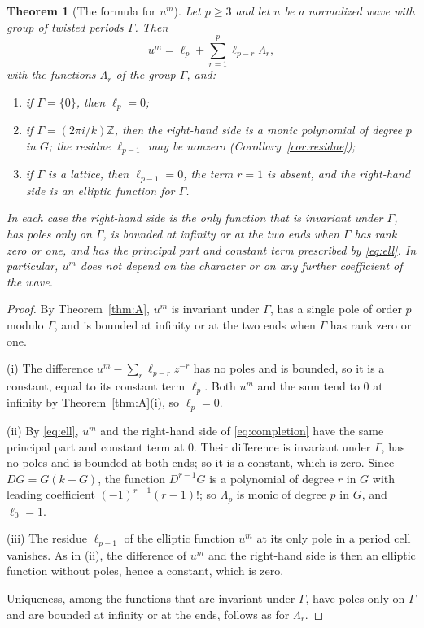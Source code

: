 \documentclass[11pt]{article}
\newtheorem{theorem}{Theorem}[section]
\theoremstyle{definition}
\theoremstyle{remark}
\numberwithin{equation}{section}
\newcommand{\ZZ}{\mathbb Z}
\begin{document}
\begin{theorem}[The formula for \(u^m\)]\label{thm:power}
Let \(p\ge3\) and let \(u\) be a normalized wave with group of twisted
periods \(\Gamma\). Then
\begin{equation}\label{eq:completion}
 u^m=\ell_p+\sum_{r=1}^{p}\ell_{p-r}\Lambda_r,
\end{equation}
with the functions \(\Lambda_r\) of the group \(\Gamma\), and:
\begin{enumerate}[label=\textup{(\roman*)},leftmargin=2.2em]
\item if \(\Gamma=\{0\}\), then \(\ell_p=0\);
\item if \(\Gamma=(2\pi i/k)\ZZ\), then the right-hand side is a monic
polynomial of degree \(p\) in \(G\); the residue \(\ell_{p-1}\) may be
nonzero (Corollary~\ref{cor:residue});
\item if \(\Gamma\) is a lattice, then \(\ell_{p-1}=0\), the term
\(r=1\) is absent, and the right-hand side is an elliptic function for
\(\Gamma\).
\end{enumerate}
In each case the right-hand side is the only function that is invariant
under \(\Gamma\), has poles only on \(\Gamma\), is bounded at infinity or
at the two ends when \(\Gamma\) has rank zero or one, and has the
principal part and constant term prescribed by \eqref{eq:ell}. In particular, \(u^m\) does not depend on the character
or on any further coefficient of the wave.
\end{theorem}

\begin{proof}
By Theorem~\ref{thm:A}, \(u^m\) is invariant under \(\Gamma\), has a
single pole of order \(p\) modulo \(\Gamma\), and is bounded at infinity
or at the two ends when \(\Gamma\) has rank zero or one.

(i) The difference \(u^m-\sum_r\ell_{p-r}z^{-r}\) has no poles and is
bounded, so it is a constant, equal to its constant term \(\ell_p\).
Both \(u^m\) and the sum tend to \(0\) at infinity by
Theorem~\ref{thm:A}(i), so \(\ell_p=0\).

(ii) By \eqref{eq:ell}, \(u^m\) and the right-hand side of
\eqref{eq:completion} have the same principal part and constant term
at \(0\). Their difference is invariant under \(\Gamma\), has no poles
and is bounded at both ends; so it is a constant, which is zero. Since
\(DG=G(k-G)\), the function \(D^{r-1}G\) is a polynomial of degree \(r\)
in \(G\) with leading coefficient \((-1)^{r-1}(r-1)!\); so \(\Lambda_p\)
is monic of degree \(p\) in \(G\), and \(\ell_0=1\).

(iii) The residue \(\ell_{p-1}\) of the elliptic function \(u^m\) at its
only pole in a period cell vanishes. As in (ii), the difference of
\(u^m\) and the right-hand side is then an elliptic function without
poles, hence a constant, which is zero.

Uniqueness, among the functions that are invariant under \(\Gamma\),
have poles only on \(\Gamma\) and are bounded at infinity or at the
ends, follows as for \(\Lambda_r\).
\end{proof}
\end{document}
